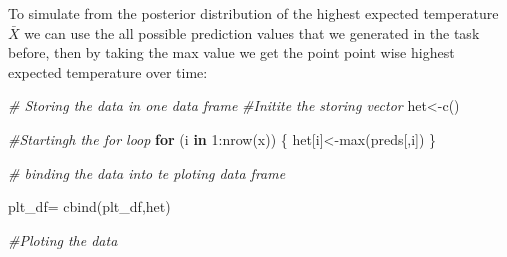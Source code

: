 \documentclass[
]{article}
\newenvironment{Shaded}{\begin{snugshade}}{\end{snugshade}}
\newcommand{\CommentTok}[1]{\textcolor[rgb]{0.56,0.35,0.01}{\textit{#1}}}
\newcommand{\ControlFlowTok}[1]{\textcolor[rgb]{0.13,0.29,0.53}{\textbf{#1}}}
\newcommand{\DecValTok}[1]{\textcolor[rgb]{0.00,0.00,0.81}{#1}}
\newcommand{\FunctionTok}[1]{\textcolor[rgb]{0.00,0.00,0.00}{#1}}
\newcommand{\NormalTok}[1]{#1}
\newcommand{\OtherTok}[1]{\textcolor[rgb]{0.56,0.35,0.01}{#1}}
\newcommand{\SpecialCharTok}[1]{\textcolor[rgb]{0.00,0.00,0.00}{#1}}
\begin{document}
To simulate from the posterior distribution of the highest expected
temperature \(\bar X\) we can use the all possible prediction values
that we generated in the task before, then by taking the max value we
get the point point wise highest expected temperature over time:

\begin{Shaded}
\begin{Highlighting}[]
\CommentTok{\# Storing the data in one data frame}
\CommentTok{\#Initite the storing vector}
\NormalTok{het}\OtherTok{\textless{}{-}}\FunctionTok{c}\NormalTok{()}

\CommentTok{\#Startingh the for loop }
\ControlFlowTok{for}\NormalTok{ (i }\ControlFlowTok{in} \DecValTok{1}\SpecialCharTok{:}\FunctionTok{nrow}\NormalTok{(x)) \{}
\NormalTok{  het[i]}\OtherTok{\textless{}{-}}\FunctionTok{max}\NormalTok{(preds[,i]) }
\NormalTok{\}}

\CommentTok{\# binding the data into te ploting data frame}

\NormalTok{plt\_df}\OtherTok{=} \FunctionTok{cbind}\NormalTok{(plt\_df,het)}

\CommentTok{\#Ploting the data}


\end{Highlighting}
\end{Shaded}
\end{document}
